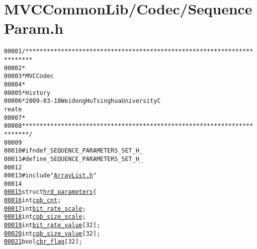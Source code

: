 \hypertarget{_sequence_param_8h_source}{
\section{MVCCommonLib/Codec/SequenceParam.h}
}


\begin{footnotesize}\begin{alltt}
00001 \textcolor{comment}{/************************************************************************}
00002 \textcolor{comment}{ *}
00003 \textcolor{comment}{ * MVC Codec}
00004 \textcolor{comment}{ * }
00005 \textcolor{comment}{ * History}
00006 \textcolor{comment}{ * 2009-03-18           Weidong Hu              Tsinghua University             C
      reate}
00007 \textcolor{comment}{ * }
00008 \textcolor{comment}{ ************************************************************************/}
00009 
00010 \textcolor{preprocessor}{#ifndef \_SEQUENCE\_PARAMETERS\_SET\_H\_}
00011 \textcolor{preprocessor}{}\textcolor{preprocessor}{#define \_SEQUENCE\_PARAMETERS\_SET\_H\_}
00012 \textcolor{preprocessor}{}
00013 \textcolor{preprocessor}{#include "\hyperlink{_array_list_8h}{ArrayList.h}"}
00014 
\hypertarget{_sequence_param_8h_source_l00015}{}\hyperlink{structhrd__parameters}{00015} \textcolor{keyword}{struct }\hyperlink{structhrd__parameters}{hrd_parameters} \{
\hypertarget{_sequence_param_8h_source_l00016}{}\hyperlink{structhrd__parameters_a5c6bed7c8fb56f19fcc45d6b48da49af}{00016}         \textcolor{keywordtype}{int} \hyperlink{structhrd__parameters_a5c6bed7c8fb56f19fcc45d6b48da49af}{cpb_cnt};
\hypertarget{_sequence_param_8h_source_l00017}{}\hyperlink{structhrd__parameters_ace569254868da81da601fe785961eeab}{00017}         \textcolor{keywordtype}{int} \hyperlink{structhrd__parameters_ace569254868da81da601fe785961eeab}{bit_rate_scale};
\hypertarget{_sequence_param_8h_source_l00018}{}\hyperlink{structhrd__parameters_a1609158ce4cbe36e43435936d38b8f59}{00018}         \textcolor{keywordtype}{int} \hyperlink{structhrd__parameters_a1609158ce4cbe36e43435936d38b8f59}{cpb_size_scale};
\hypertarget{_sequence_param_8h_source_l00019}{}\hyperlink{structhrd__parameters_a201add02afdd5156e2559a0420c7ef0f}{00019}         \textcolor{keywordtype}{int} \hyperlink{structhrd__parameters_a201add02afdd5156e2559a0420c7ef0f}{bit_rate_value}[32];
\hypertarget{_sequence_param_8h_source_l00020}{}\hyperlink{structhrd__parameters_a7a2bb5e5dc6c92094669161b33fa5e61}{00020}         \textcolor{keywordtype}{int} \hyperlink{structhrd__parameters_a7a2bb5e5dc6c92094669161b33fa5e61}{cpb_size_value}[32];
\hypertarget{_sequence_param_8h_source_l00021}{}\hyperlink{structhrd__parameters_aa759c54246d4b4a1ceecc44d56c352c5}{00021}         \textcolor{keywordtype}{bool} \hyperlink{structhrd__parameters_aa759c54246d4b4a1ceecc44d56c352c5}{cbr_flag}[32];

\end{alltt}
\end{footnotesize}

